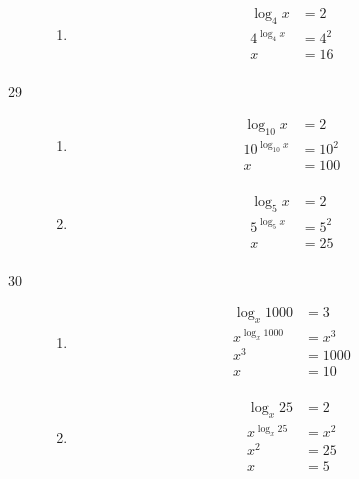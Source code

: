 \documentclass{exam}
\begin{document}
\begin{description}
\begin{enumerate}[a]
        \item 
          \begin{align*}
            \log_4 x     &= 2 \\
            4^{\log_4 x} &= 4^2 \\
            x            &= 16 \\
          \end{align*}
      \end{enumerate}

    \item[29]
      \begin{enumerate}[a]
        \item 
          \begin{align*}
            \log_{10} x      &= 2 \\
            10^{\log_{10} x} &= 10^2 \\
            x                &= 100 \\
          \end{align*}

        \item 
          \begin{align*}
            \log_{5} x     &= 2 \\
            5^{\log_{5} x} &= 5^2 \\
            x              &= 25 \\
          \end{align*}

      \end{enumerate}

    \item[30]
      \begin{enumerate}[a]
        \item 
          \begin{align*}
            \log_x 1000     &= 3 \\
            x^{\log_x 1000} &= x^3 \\
            x^3             &= 1000 \\
            x               &= 10 \\
          \end{align*}

        \item 
          \begin{align*}
            \log_x 25     &= 2 \\
            x^{\log_x 25} &= x^2 \\
            x^2           &= 25 \\
            x             &= 5 \\
          \end{align*}
      \end{enumerate}


\end{description}
\end{document}
